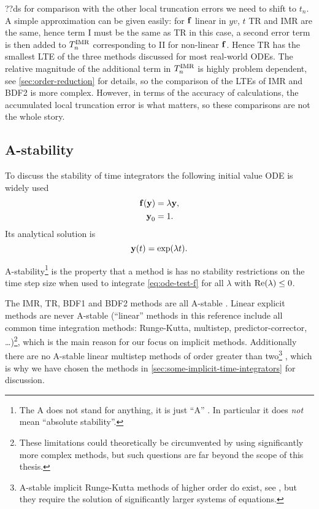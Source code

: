 ??ds for comparison with the other local truncation errors we need to shift to $t_n$.
A simple approximation can be given easily: for ${\boldsymbol{\mathrm{f}}}$ linear in $yv$, $t$ TR and IMR are the same, hence term I must be the same as TR in this case, a second error term is then added to $T_n^{\mathrm{IMR}}$ corresponding to II for non-linear ${\boldsymbol{\mathrm{f}}}$.
Hence TR has the smallest LTE of the three methods discussed for most real-world ODEs.
The relative magnitude of the additional term in $T_n^{\mathrm{IMR}}$ is highly problem dependent, see \cref{sec:order-reduction} for details, so the comparison of the LTEs of IMR and BDF2 is more complex.
However, in terms of the accuracy of calculations, the accumulated local truncation error is what matters, so these comparisons are not the whole story.

\subsection{A-stability}
\label{sec:A-stability}

To discuss the stability of time integrators the following initial value ODE is widely used
\begin{equation}
  \begin{aligned}
    {\boldsymbol{\mathrm{f}}{\left( \boldsymbol{\mathrm{y}}\right)}} &= \lambda \boldsymbol{\mathrm{y}}, \\
    \boldsymbol{\mathrm{y}}_0 &= 1.
    \label{eq:ode-test-f}
  \end{aligned}
\end{equation}
Its analytical solution is
\begin{equation}
  \boldsymbol{\mathrm{y}}(t) = \exp(\lambda t).
\end{equation}

A-stability\footnote{The A does not stand for anything, it is just ``A'' \cite[40]{HairerWanner}. In particular it does \emph{not} mean ``absolute stability''.} is the property that a method is has no stability restrictions on the time step size when used to integrate \cref{eq:ode-test-f} for all $\lambda$ with $\operatorname{Re}(\lambda) \leq 0$.

The IMR, TR, BDF1 and BDF2 methods are all A-stable \cite[pgs. 43, 251]{HairerWanner}.
Linear explicit methods are never A-stable \cite{Nevanlinna1974} (``linear'' methods in this reference include all common time integration methods: Runge-Kutta, multistep, predictor-corrector, \ldots)\footnote{These limitations could theoretically be circumvented by using significantly more complex methods, but such questions are far beyond the scope of this thesis.}, which is the main reason for our focus on implicit methods.
Additionally there are no A-stable linear multistep methods of order greater than two\footnote{A-stable implicit Runge-Kutta methods of higher order do exist, see \eg \cite[73]{HairerWanner}, but they require the solution of significantly larger systems of equations.} \cite[261]{GreshoSani}, which is why we have chosen the  methods in \cref{sec:some-implicit-time-integrators} for discussion.

